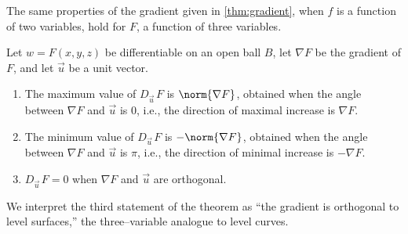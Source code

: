 The same properties of the gradient given in \autoref{thm:gradient}, when $f$ is a function of two variables, hold for $F$, a function of three variables.

{Let $w=F(x,y,z)$ be differentiable on an open ball $B$, let $\nabla F$ be the gradient of $F$, and let $\vec u$ be a unit vector.
\begin{enumerate}
	\item The maximum value of $D_{\vec u\,}F$ is $\norm{\nabla F}$, obtained when the angle between $\nabla F$ and $\vec u$ is 0, i.e.,  the direction of maximal increase is $\nabla F$.
	\item The minimum value of $D_{\vec u\,}F$ is $-\norm{\nabla F}$, obtained when the angle between $\nabla F$ and $\vec u$ is $\pi$, i.e., the direction of minimal increase is $-\nabla F$.
	\item $D_{\vec u\,}F = 0$ when $\nabla F$ and $\vec u$ are orthogonal.
\end{enumerate}
}

We interpret the third statement of the theorem as ``the gradient is orthogonal to level surfaces,'' the three--variable analogue to level curves.\\

